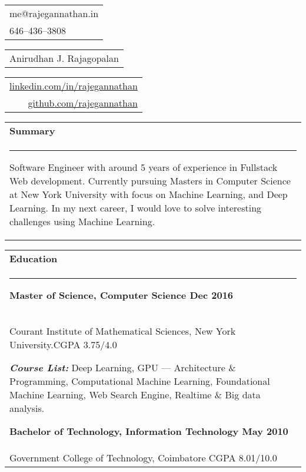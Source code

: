 \documentclass{article}
\begin{document}
{\small\begin{tabular}[c]{l}
	me@rajegannathan.in \\
	646--436--3808
\end{tabular}}\hfill%
{\Large\bfseries\begin{tabular}[c]{c}
	Anirudhan J. Rajagopalan
\end{tabular}}\hfill%
{\small\begin{tabular}[c]{r}
	\href{https://linkedin.com/in/rajegannathan}{linkedin.com/in/rajegannathan} \\
	\href{https://github.com/rajegannathan}{github.com/rajegannathan}
\end{tabular}}%

\bigskip

\begin{tabular}{p{\dimexpr\linewidth-2\tabcolsep}}
	\textbf{\large{Summary}}\\
	\noindent\rule{\textwidth}{0.4pt}
	\begin{adjustwidth}{0.5cm}{0.5cm}
	\small{Software Engineer with around 5 years of experience in Fullstack Web development. Currently pursuing Masters in Computer Science at New York University with focus on Machine Learning, and Deep Learning.  In my next career, I would love to solve interesting challenges using Machine Learning.}
	\end{adjustwidth}
\end{tabular}

\begin{tabular}{p{\dimexpr\linewidth-2\tabcolsep}}
	\textbf{\large{Education}} \\
	\noindent\rule{\textwidth}{0.4pt}
	{\bfseries Master of Science, Computer Science \hfill Dec 2016} \\
	\quad Courant Institute of Mathematical Sciences, New York University.\hfill CGPA 3.75/4.0
	\begin{adjustwidth}{0.35cm}{}
	\textbf{\textit{Course List:}} Deep Learning, GPU --- Architecture \& Programming, Computational Machine Learning, Foundational Machine Learning, Web Search Engine, Realtime \& Big data analysis.
	\end{adjustwidth}

	\smallskip
	{\bfseries Bachelor of Technology, Information Technology \hfill May 2010} \\
	\quad Government College of Technology, Coimbatore \hfill CGPA 8.01/10.0
\end{tabular}

\bigskip
\end{document}
